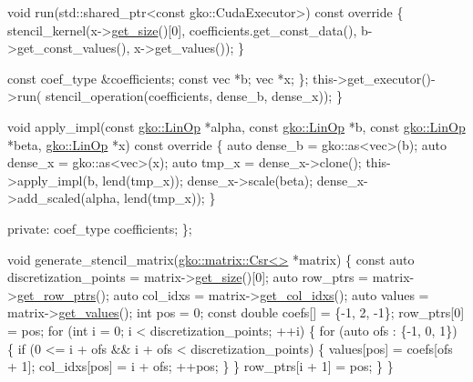 \begin{DoxyCodeInclude}
            \textcolor{keywordtype}{void} run(std::shared\_ptr<const gko::CudaExecutor>)\textcolor{keyword}{ const override}
\textcolor{keyword}{            }\{
                stencil\_kernel(x->\hyperlink{classgko_1_1LinOp_a31b3c003388eb0b95393154f68c2b98d}{get\_size}()[0], coefficients.get\_const\_data(),
                               b->get\_const\_values(), x->get\_values());
            \}


            \textcolor{keyword}{const} coef\_type &coefficients;
            \textcolor{keyword}{const} vec *b;
            vec *x;
        \};
        this->get\_executor()->run(
            stencil\_operation(coefficients, dense\_b, dense\_x));
    \}

    \textcolor{keywordtype}{void} apply\_impl(\textcolor{keyword}{const} \hyperlink{classgko_1_1LinOp}{gko::LinOp} *alpha, \textcolor{keyword}{const} \hyperlink{classgko_1_1LinOp}{gko::LinOp} *b,
                    \textcolor{keyword}{const} \hyperlink{classgko_1_1LinOp}{gko::LinOp} *beta, \hyperlink{classgko_1_1LinOp}{gko::LinOp} *x)\textcolor{keyword}{ const override}
\textcolor{keyword}{    }\{
        \textcolor{keyword}{auto} dense\_b = gko::as<vec>(b);
        \textcolor{keyword}{auto} dense\_x = gko::as<vec>(x);
        \textcolor{keyword}{auto} tmp\_x = dense\_x->clone();
        this->apply\_impl(b, lend(tmp\_x));
        dense\_x->scale(beta);
        dense\_x->add\_scaled(alpha, lend(tmp\_x));
    \}

\textcolor{keyword}{private}:
    coef\_type coefficients;
\};


\textcolor{keywordtype}{void} generate\_stencil\_matrix(\hyperlink{classgko_1_1matrix_1_1Csr}{gko::matrix::Csr<>} *matrix)
\{
    \textcolor{keyword}{const} \textcolor{keyword}{auto} discretization\_points = matrix->\hyperlink{classgko_1_1LinOp_a31b3c003388eb0b95393154f68c2b98d}{get\_size}()[0];
    \textcolor{keyword}{auto} row\_ptrs = matrix->\hyperlink{classgko_1_1matrix_1_1Csr_a068e5158cf282fa977f0a137f8cd7f03}{get\_row\_ptrs}();
    \textcolor{keyword}{auto} col\_idxs = matrix->\hyperlink{classgko_1_1matrix_1_1Csr_a81c6294177a1be4873804c8a85a9fc64}{get\_col\_idxs}();
    \textcolor{keyword}{auto} values = matrix->\hyperlink{classgko_1_1matrix_1_1Csr_a929b0a194e6aeb1252b8e6781d162e83}{get\_values}();
    \textcolor{keywordtype}{int} pos = 0;
    \textcolor{keyword}{const} \textcolor{keywordtype}{double} coefs[] = \{-1, 2, -1\};
    row\_ptrs[0] = pos;
    \textcolor{keywordflow}{for} (\textcolor{keywordtype}{int} i = 0; i < discretization\_points; ++i) \{
        \textcolor{keywordflow}{for} (\textcolor{keyword}{auto} ofs : \{-1, 0, 1\}) \{
            \textcolor{keywordflow}{if} (0 <= i + ofs && i + ofs < discretization\_points) \{
                values[pos] = coefs[ofs + 1];
                col\_idxs[pos] = i + ofs;
                ++pos;
            \}
        \}
        row\_ptrs[i + 1] = pos;
    \}
\}



\end{DoxyCodeInclude}
